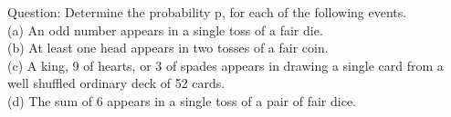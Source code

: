 \documentclass[journal,12pt,onecolumn]{IEEEtran}
\theoremstyle{remark}
\begin{document}
%
Question: Determine the probability p, for each of the following events.\\
(a) An odd number appears in a single toss of a fair die.\\
(b) At least one head appears in two tosses of a fair coin.\\
(c) A king, 9 of hearts, or 3 of spades appears in drawing a single card from a
well shuffled ordinary deck of 52 cards.\\
(d) The sum of 6 appears in a single toss of a pair of fair dice.
\fi
\\ \solution 
\end{document}
